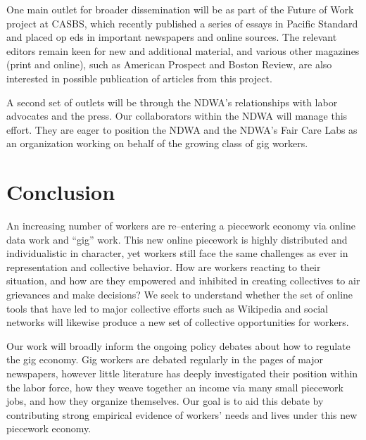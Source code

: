\documentclass[11pt]{article}
\begin{document}
One main outlet for broader dissemination will be as part of
the Future of Work project at CASBS,
which recently published a series of essays in
Pacific Standard and placed op eds in important newspapers and online sources.
The relevant editors remain keen for new and additional material,
and various other magazines
(print and online),
such as American Prospect and Boston Review,
are also interested in possible publication of articles from this project. 

A second set of outlets will be through
the NDWA's relationships with labor advocates and the press.
Our collaborators within the NDWA will manage this effort.
They are eager to position the NDWA and
the NDWA's Fair Care Labs
as an organization working on behalf of the growing class of gig workers.




\section{Conclusion}
An increasing number of workers are re--entering a piecework economy
via online data work and ``gig'' work.
This new online piecework is highly distributed and
individualistic in character, yet
workers still face the same challenges as ever in
representation and
collective behavior.
How are workers reacting to their situation,
and how are they empowered and inhibited in creating collectives
to air grievances and make decisions?
We seek to understand whether the set of online tools that have led to major collective efforts such as Wikipedia and social networks will likewise produce a new set of collective opportunities for workers.

Our work will broadly inform the ongoing policy debates about how to regulate the gig economy.
Gig workers are debated regularly in the pages of major newspapers,
however little literature has deeply investigated their position within the labor force,
how they weave together an income via many small piecework jobs,
and how they organize themselves.
Our goal is to aid this debate by contributing strong empirical evidence of workers' needs and lives under this new piecework economy.
\end{document}
